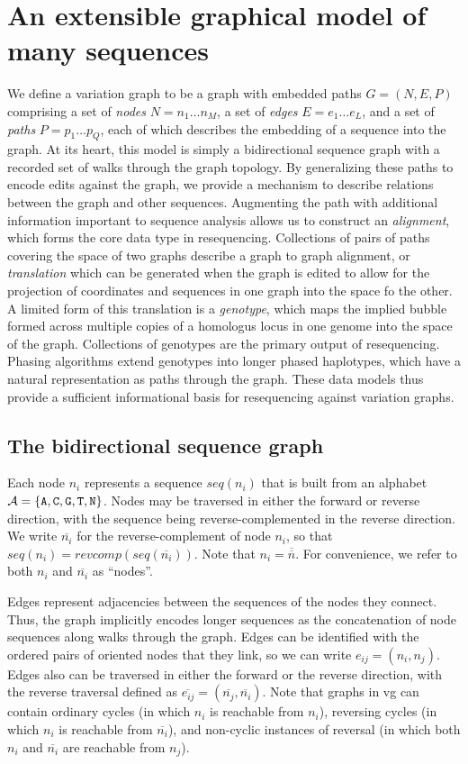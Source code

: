 \section{An extensible graphical model of many sequences}

We define a variation graph to be a graph with embedded paths $G = (N, E, P)$ comprising a set of \emph{nodes} $N = n_1 \ldots n_M$, a set of \emph{edges} $E = e_1 \ldots e_L$, and a set of \emph{paths} $P = p_1 \ldots p_Q$, each of which describes the embedding of a sequence into the graph.
At its heart, this model is simply a bidirectional sequence graph with a recorded set of walks through the graph topology.
By generalizing these paths to encode edits against the graph, we provide a mechanism to describe relations between the graph and other sequences.
Augmenting the path with additional information important to sequence analysis allows us to construct an \emph{alignment}, which forms the core data type in resequencing.
Collections of pairs of paths covering the space of two graphs describe a graph to graph alignment, or \emph{translation} which can be generated when the graph is edited to allow for the projection of coordinates and sequences in one graph into the space fo the other.
A limited form of this translation is a \emph{genotype}, which maps the implied bubble formed across multiple copies of a homologus locus in one genome into the space of the graph.
Collections of genotypes are the primary output of resequencing.
Phasing algorithms extend genotypes into longer phased haplotypes, which have a natural representation as paths through the graph.
These data models thus provide a sufficient informational basis for resequencing against variation graphs.

\subsection{The bidirectional sequence graph}

Each node $n_i$ represents a sequence $seq(n_i)$ that is built from an alphabet ${ \cal A } = \{ {\tt A, C, G, T, N} \}$. Nodes may be traversed in either the forward or reverse direction, with the sequence being reverse-complemented in the reverse direction.
We write $\overline{n_i}$ for the reverse-complement of node $n_i$, so that $seq(n_i) = revcomp(seq(\overline{n_i}))$.
Note that $n_i = \overline{\overline{n}}$. For convenience, we refer to both $n_i$ and $\overline{n_i}$ as ``nodes''.

Edges represent adjacencies between the sequences of the nodes they connect.
Thus, the graph implicitly encodes longer sequences as the concatenation of node sequences along walks through the graph.
Edges can be identified with the ordered pairs of oriented nodes that they link, so we can write $e_{ij} = (n_i,n_j)$.
Edges also can be traversed in either the forward or the reverse direction, with the reverse traversal defined as $\overline{e_{ij}} = (\overline{n_j},\overline{n_i})$.
Note that graphs in vg can contain ordinary cycles (in which $n_i$ is reachable from $n_i$), reversing cycles (in which $n_i$ is reachable from $\overline{n_i}$), and non-cyclic instances of reversal (in which both $n_i$ and $\overline{n_i}$ are reachable from $n_j$).

